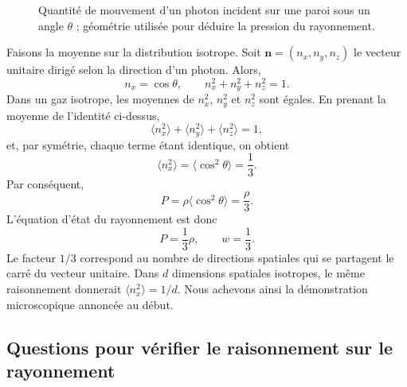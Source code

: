\begin{figure}[htbp]
\centering
{}
\caption{Quantité de mouvement d’un photon incident sur une paroi sous un angle \(\theta\) ; géométrie utilisée pour déduire la pression du rayonnement.}
\label{fig:c05-photon-pressure}
\end{figure}

Faisons la moyenne sur la distribution isotrope. Soit \(\mathbf n=(n_x,n_y,n_z)\) le vecteur unitaire dirigé selon la direction d’un photon. Alors,
\begin{equation}
n_x=\cos\theta,
\qquad
n_x^2+n_y^2+n_z^2=1.
\end{equation}
Dans un gaz isotrope, les moyennes de \(n_x^2\), \(n_y^2\) et \(n_z^2\) sont égales. En prenant la moyenne de l’identité ci-dessus,
\begin{equation}
\langle n_x^2\rangle+\langle n_y^2\rangle+\langle n_z^2\rangle=1,
\end{equation}
et, par symétrie, chaque terme étant identique, on obtient
\begin{equation}
\langle n_x^2\rangle=\langle \cos^2\theta\rangle=\frac13.
\end{equation}
Par conséquent,
\begin{equation}
P=\rho\langle \cos^2\theta\rangle=\frac{\rho}{3}.
\end{equation}
L’équation d’état du rayonnement est donc
\begin{equation}
P=\frac13\rho,
\qquad
w=\frac13.
\end{equation}
Le facteur \(1/3\) correspond au nombre de directions spatiales qui se partagent le carré du vecteur unitaire. Dans \(d\) dimensions spatiales isotropes, le même raisonnement donnerait \(\langle n_x^2\rangle=1/d\). Nous achevons ainsi la démonstration microscopique annoncée au début.

\subsection{Questions pour vérifier le raisonnement sur le rayonnement}

